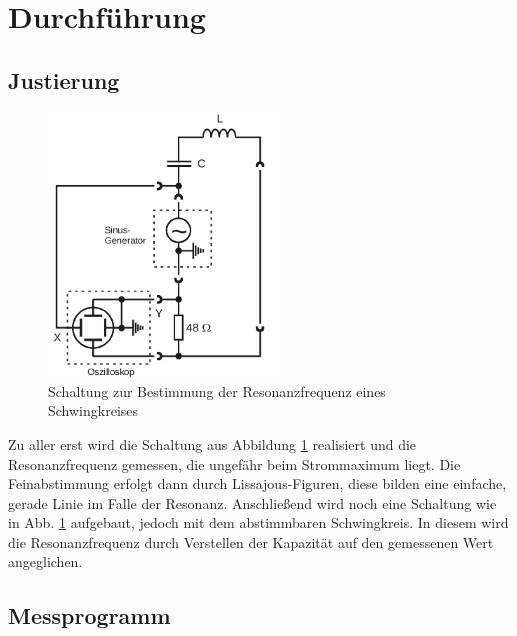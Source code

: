 \newpage
\section{Durchführung}
\label{sec:Durchführung}
\subsection{Justierung}
\begin{figure}
  \centering
  \includegraphics[height= 7cm]{./logos/Abb5.png}
  \caption{Schaltung zur Bestimmung der Resonanzfrequenz eines Schwingkreises\cite{sample}}
  \label{fig:Abb5}
\end{figure}
\FloatBarrier
Zu aller erst wird die Schaltung aus Abbildung \ref{fig:Abb5} realisiert und die Resonanzfrequenz gemessen, die ungefähr beim Strommaximum liegt. Die Feinabstimmung
erfolgt dann durch Lissajous-Figuren, diese bilden eine einfache, gerade Linie im Falle der Resonanz. Anschließend wird  noch eine Schaltung wie in Abb. \ref{fig:Abb5} aufgebaut, jedoch mit dem
abstimmbaren Schwingkreis. In diesem wird die Resonanzfrequenz durch Verstellen der Kapazität auf den gemessenen Wert angeglichen.
\newpage
\subsection{Messprogramm}
